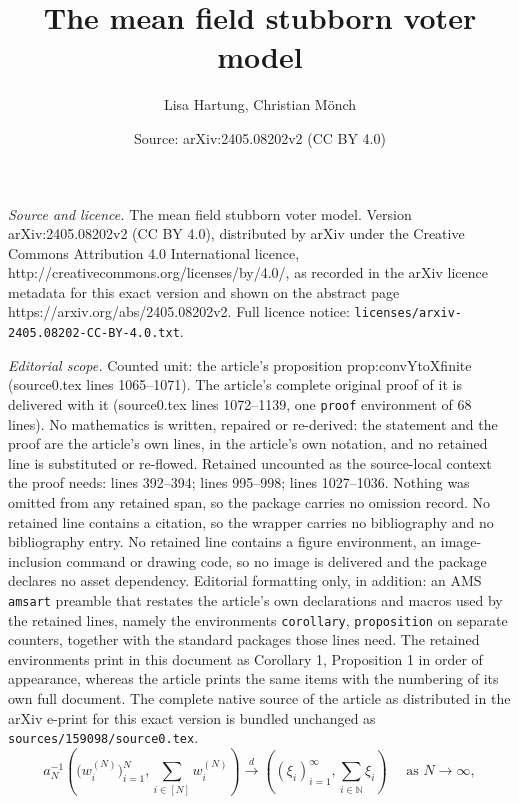 \documentclass[10pt,a4paper]{amsart}
\title{The mean field stubborn voter model}
\author{Lisa Hartung, Christian M\"onch}
\date{Source: arXiv:2405.08202v2 (CC BY 4.0)}
\begin{document}
\maketitle

\noindent\emph{Source and licence.} The mean field stubborn voter model. Version arXiv:2405.08202v2 (CC BY 4.0), distributed by arXiv under the Creative Commons Attribution 4.0 International licence, http://creativecommons.org/licenses/by/4.0/, as recorded in the arXiv licence metadata for this exact version and shown on the abstract page https://arxiv.org/abs/2405.08202v2. Full licence notice: \texttt{licenses/arxiv-2405.08202-CC-BY-4.0.txt}.\par\smallskip

\noindent\textit{Editorial scope.} Counted unit: the article's proposition prop:convYtoXfinite (source0.tex lines 1065--1071). The article's complete original proof of it is delivered with it (source0.tex lines 1072--1139, one \texttt{proof} environment of 68 lines). No mathematics is written, repaired or re-derived: the statement and the proof are the article's own lines, in the article's own notation, and no retained line is substituted or re-flowed.  Retained uncounted as the source-local context the proof needs: lines 392--394; lines 995--998; lines 1027--1036.  Nothing was omitted from any retained span, so the package carries no omission record.  No retained line contains a citation, so the wrapper carries no bibliography and no bibliography entry.  No retained line contains a figure environment, an image-inclusion command or drawing code, so no image is delivered and the package declares no asset dependency.  Editorial formatting only, in addition: an AMS \texttt{amsart} preamble that restates the article's own declarations and macros used by the retained lines, namely the environments \texttt{corollary}, \texttt{proposition} on separate counters, together with the standard packages those lines need.  The retained environments print in this document as Corollary 1, Proposition 1 in order of appearance, whereas the article prints the same items with the numbering of its own full document.  The complete native source of the article as distributed in the arXiv e-print for this exact version is bundled unchanged as \texttt{sources/159098/source0.tex}.
\begin{equation}\label{eq:limweights}
	a_N^{-1}\left(\big(w_i^{(N)}\big)_{i=1}^N, \sum_{i\in[N]}w_i^{(N)} \right) \overset{d}{\longrightarrow} \left((\xi_i)_{i=1}^{\infty}, \sum_{i\in\mathbb{N}}\xi_i\right)\quad \text{ as }N\to\infty,
\end{equation}
\end{document}
